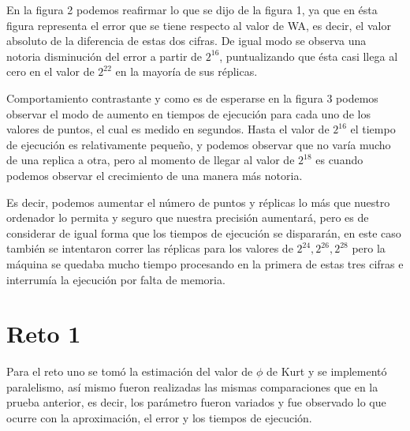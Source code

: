 \documentclass[a4paper]{article}
\begin{document}
En la figura 2 podemos reafirmar lo que se dijo de la figura 1, ya que en ésta figura representa el error que se tiene respecto al valor de WA, es decir, el valor absoluto de la diferencia de estas dos cifras. De igual modo se observa una notoria disminución del error a partir de $2^{16}$, puntualizando que ésta casi llega al cero en el valor de $2^{22}$ en la mayoría de sus réplicas.

Comportamiento contrastante y como es de esperarse en la figura 3 podemos observar el modo de aumento en tiempos de ejecución para cada uno de los valores de puntos, el cual es medido en segundos. Hasta el valor de $2^{16}$ el tiempo de ejecución es relativamente pequeño, y podemos observar que no varía mucho de una replica a otra, pero al momento de llegar al valor de $2^{18}$ es cuando podemos observar el crecimiento de una manera más notoria.

Es decir, podemos aumentar el número de puntos y réplicas lo más que nuestro ordenador lo permita y seguro que nuestra precisión aumentará, pero es de considerar de igual forma que los tiempos de ejecución se dispararán, en este caso también se intentaron correr las réplicas para los valores de $2^{24}, 2^{26}, 2^{28}$ pero la máquina se quedaba mucho tiempo procesando en la primera de estas tres cifras e interrumía la ejecución por falta de memoria.
 
\section{Reto 1}
Para el reto uno se tomó la estimación del valor de $\phi$ de Kurt y se implementó paralelismo, así mismo fueron realizadas las mismas comparaciones que en la prueba anterior, es decir, los parámetro fueron variados y fue observado lo que ocurre con la aproximación, el error y los tiempos de ejecución.
\end{document}
